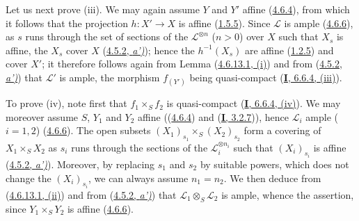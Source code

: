 Let us next prove (iii). We may again assume $Y$ and $Y'$ affine
(\hyperref[II.4.6.4]{4.6.4}), from which it follows that the projection
$h:X'\to X$ is affine (\hyperref[II.1.5.5]{1.5.5}). Since
$\mathcal{L}$ is ample (\hyperref[II.4.6.6]{4.6.6}), as $s$
runs through the set of sections of the $\mathcal{L}^{\otimes n}$ ($n>0$)
over $X$ such that $X_s$ is affine, the $X_s$ cover $X$
(\hyperref[II.4.5.2]{4.5.2, \emph{a')}}); hence the $h^{-1}(X_s)$ are affine
(\hyperref[II.1.2.5]{1.2.5}) and cover $X'$; it therefore follows again
from Lemma (\hyperref[II.4.6.13.1]{4.6.13.1, (i)}) and from
(\hyperref[II.4.5.2]{4.5.2, \emph{a')}}) that $\mathcal{L}'$ is ample, the
morphism $f_{(Y')}$ being quasi-compact
(\hyperref[I.6.6.4]{\textbf{I}, 6.6.4, (iii)}).

To prove (iv), note first that $f_1\times_S f_2$ is quasi-compact
(\hyperref[I.6.6.4]{\textbf{I}, 6.6.4, (iv)}). We may moreover assume $S$,
$Y_1$ and $Y_2$ affine ((\hyperref[II.4.6.4]{4.6.4}) and
(\hyperref[I.3.2.7]{\textbf{I}, 3.2.7})), hence $\mathcal{L}_i$ ample ($i=1,2$)
(\hyperref[II.4.6.6]{4.6.6}). The open subsets
$(X_1)_{s_1}\times_S(X_2)_{s_2}$ form a covering of
$X_1\times_S X_2$ as $s_i$ runs through the sections of the
$\mathcal{L}_i^{\otimes n_i}$ such that $(X_i)_{s_i}$ is affine
(\hyperref[II.4.5.2]{4.5.2, \emph{a')}}). Moreover, by replacing $s_1$ and
$s_2$ by suitable powers, which does not change the
$(X_i)_{s_i}$, we can always assume $n_1=n_2$. We then deduce from
(\hyperref[II.4.6.13.1]{4.6.13.1, (ii)}) and from
(\hyperref[II.4.5.2]{4.5.2, \emph{a')}}) that
$\mathcal{L}_1\otimes_S\mathcal{L}_2$ is ample, whence the assertion, since
$Y_1\times_S Y_2$ is affine (\hyperref[II.4.6.6]{4.6.6}).

